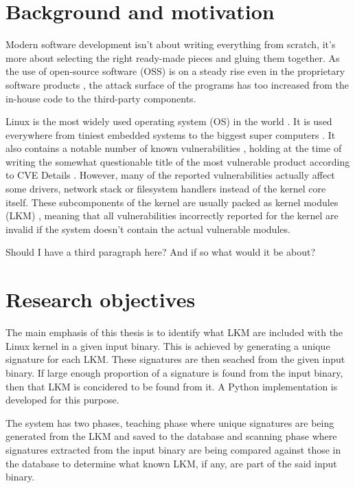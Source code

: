 
\section{Background and motivation}

Modern software development isn't about writing everything from scratch, it's more about selecting
the right ready-made pieces and gluing them together. As the use of open-source software (OSS) is
on a steady rise even in the proprietary software products \cite{deshpande2008total}, the attack
surface of the programs has too increased from the in-house code to the third-party components.

Linux is the most widely used operating system (OS) in the world \cite{osmarketshare}\footnotemark.
It is used everywhere from tiniest embedded systems \cite{picotux} to the biggest super computers
\cite{top500linuxshare}. It also contains a notable number of known vulnerabilities
\cite{cvedetailslinuxkernel}, holding at the time of writing the somewhat questionable title of the
most vulnerable product according to CVE Details \cite{cvedetailstop50}. However, many of the
reported vulnerabilities actually affect some drivers, network stack or filesystem handlers instead
of the kernel core itself. These subcomponents of the kernel are usually packed as kernel modules
(LKM) \cite{whatislkm}, meaning that all vulnerabilities incorrectly reported for the kernel are
invalid if the system doesn't contain the actual vulnerable modules.

Should I have a third paragraph here? And if so what would it be about?


\section{Research objectives}

The main emphasis of this thesis is to identify what LKM are included with the Linux kernel in a
given input binary. This is achieved by generating a unique signature for each LKM. These
signatures are then seached from the given input binary. If large enough proportion of a signature
is found from the input binary, then that LKM is concidered to be found from it. A Python
implementation is developed for this purpose.

The system has two phases, teaching phase where unique signatures are being generated from the LKM
and saved to the database and scanning phase where signatures extracted from the input binary are
being compared against those in the database to determine what known LKM, if any, are part of the
said input binary.

